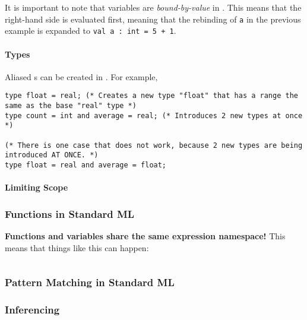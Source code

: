 It is important to note that variables are \emph{bound-by-value} in .
This means that the right-hand side is evaluated first, meaning that the rebinding of \texttt{a} in the previous example is expanded to \texttt{val a : int = 5 + 1}.

\paragraph{Types}\label{par:Functional-SML-Type_Declarations}
Aliased s can be created in .
For example,
\begin{verbatim}
type float = real; (* Creates a new type "float" that has a range the same as the base "real" type *)
type count = int and average = real; (* Introduces 2 new types at once *)

(* There is one case that does not work, because 2 new types are being introduced AT ONCE. *)
type float = real and average = float;
\end{verbatim}

\paragraph{Limiting Scope}\label{par:Functional-SML-Limit_Scope}

\subsubsection{Functions in Standard ML}\label{subsubsec:Functional-SML-Functions}
\textbf{Functions and variables share the same expression namespace!}
This means that things like this can happen:
\inputminted[frame=lines,linenos]{sml}{./EDAP05-Concepts_Programming_Languages-Sections/Code/Value_Shadowing.sml}

\subsubsection{Pattern Matching in Standard ML}\label{subsubsec:Functional-SML-Pattern_Matching}
\begin{definition}\label{def:Pattern_Matching}
  
\end{definition}

\subsubsection{ Inferencing}\label{subsubsec:Functional-SML-Data_Type_Inferencing}
\begin{definition}\label{def:Functional-SML-Data_Type_Inferencing}
  
\end{definition}


